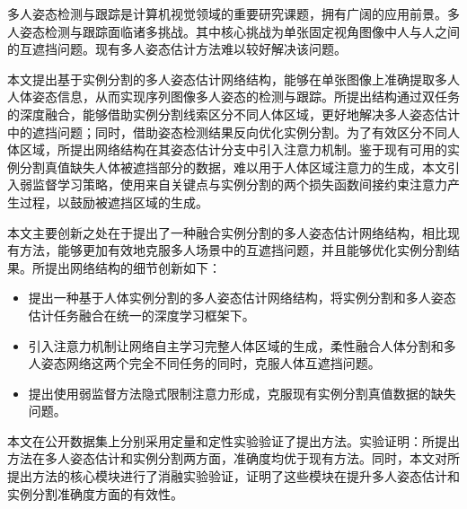 \begin{cabstract}
	多人姿态检测与跟踪是计算机视觉领域的重要研究课题，拥有广阔的应用前景。多人姿态检测与跟踪面临诸多挑战。其中核心挑战为单张固定视角图像中人与人之间的互遮挡问题。现有多人姿态估计方法难以较好解决该问题。

	本文提出基于实例分割的多人姿态估计网络结构，能够在单张图像上准确提取多人人体姿态信息，从而实现序列图像多人姿态的检测与跟踪。所提出结构通过双任务的深度融合，能够借助实例分割线索区分不同人体区域，更好地解决多人姿态估计中的遮挡问题；同时，借助姿态检测结果反向优化实例分割。为了有效区分不同人体区域，所提出网络结构在其姿态估计分支中引入注意力机制。鉴于现有可用的实例分割真值缺失人体被遮挡部分的数据，难以用于人体区域注意力的生成，本文引入弱监督学习策略，使用来自关键点与实例分割的两个损失函数间接约束注意力产生过程，以鼓励被遮挡区域的生成。

	本文主要创新之处在于提出了一种融合实例分割的多人姿态估计网络结构，相比现有方法，能够更加有效地克服多人场景中的互遮挡问题，并且能够优化实例分割结果。所提出网络结构的细节创新如下：
	\begin{itemize}
		\item 提出一种基于人体实例分割的多人姿态估计网络结构，将实例分割和多人姿态估计任务融合在统一的深度学习框架下。
	 	\item 引入注意力机制让网络自主学习完整人体区域的生成，柔性融合人体分割和多人姿态网络这两个完全不同任务的同时，克服人体互遮挡问题。
	 	\item 提出使用弱监督方法隐式限制注意力形成，克服现有实例分割真值数据的缺失问题。
	\end{itemize}

	本文在公开数据集上分别采用定量和定性实验验证了提出方法。实验证明：所提出方法在多人姿态估计和实例分割两方面，准确度均优于现有方法。同时，本文对所提出方法的核心模块进行了消融实验验证，证明了这些模块在提升多人姿态估计和实例分割准确度方面的有效性。

\end{cabstract}


